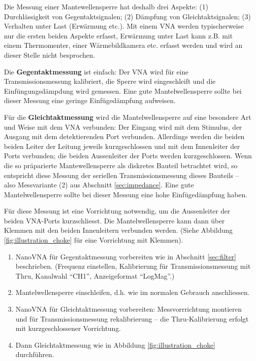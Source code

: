 \documentclass[twoside,a4paper,11pt,halfparskip,DIV=11,notitlepage]{scrartcl}
\begin{document}
Die Messung einer Mantewellensperre hat deshalb drei Aspekte:
(1) Durchlässigkeit von Gegentaktsignalen;
(2) Dämpfung von Gleichtaktsignalen;
(3) Verhalten unter Last (Erwärmung etc.).
Mit einem VNA werden typischerweise nur die ersten beiden Aspekte erfasst,
Erwärmung unter Last kann z.B. mit einem Thermomenter, einer Wärmebildkamera
etc. erfasst werden und wird an dieser Stelle nicht besprochen.

Die \textbf{Gegentaktmessung} ist einfach: Der VNA wird für eine Transmissionsmessung
kalibriert, die Sperre wird eingeschleift und die Einfüngungsdämpdung wird
gemessen. Eine gute Mantelwellensperre sollte bei dieser Messung eine geringe
Einfügedämpfung aufweisen.

Für die \textbf{Gleichtaktmessung} wird die Mantelwellensperre auf eine besondere
Art und Weise mit dem VNA verbunden: Der Eingang wird mit dem Stimulus,
der Ausgang mit dem detektierenden Port verbunden. Allerdings werden die
beiden beiden Leiter der Leitung jeweils kurzgeschlossen und mit dem
Innenleiter der Ports verbunden; die beiden Aussenleiter der Ports werden
kurzgeschlossen. Wenn die so präparierte Mantewellensperre als diskretes
Bauteil betrachtet wird, so entspricht diese Messung der seriellen
Transmissionsmessung dieses Bauteils -- also Messvariante (2) aus
Abschnitt \ref{sec:impedance}. Eine gute Mantelwellensperre
sollte bei dieser Messung eine hohe Einfügedämpfung haben.

Für diese Messung ist eine Vorrichtung notwendig, um die Aussenleiter der
beiden VNA-Ports kurzschliesst. Die Mantelwellensperre kann dann über Klemmen
mit den beiden Innenleitern verbunden werden. (Siehe Abbildung
\ref{fig:illustration_choke} für eine Vorrichtung mit Klemmen).

\begin{enumerate}
    \item NanoVNA für Gegentaktmessung vorbereiten wie in Abschnitt \ref{sec:filter} beschrieben.
        (Frequenz einstellen, Kalibrierung für Transmissionsmessung mit Thru, Kanalwahl ``CH1'',
        Anzeigeformat ``LogMag''.)
    \item Mantelwellensperre einschleifen, d.h. wie im normalen Gebrauch anschliessen.
    \item NanoVNA für Gleichtaktmessung vorbereiten: Messvorrrichtung montieren und für
        Transmissionsmessung rekalibrierung -- die Thru-Kalibrierung erfolgt mit kurzgeschlossener
        Vorrichtung.
    \item Dann Gleichtaktmessung wie in Abbildung \ref{fig:illustration_choke} durchführen.
\end{enumerate}
\end{document}
